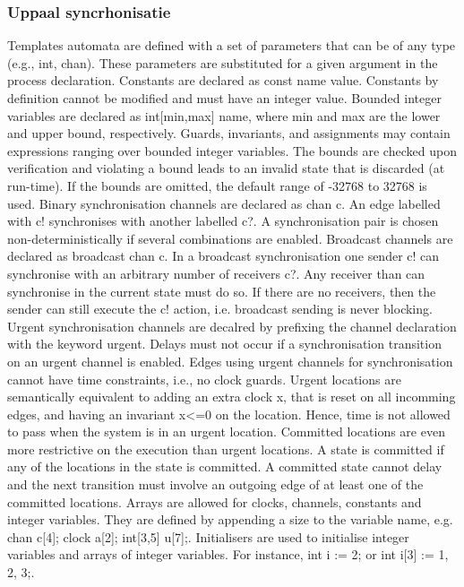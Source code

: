 \subsubsection{Uppaal syncrhonisatie}




Templates automata are defined with a set of parameters that can be of any
type (e.g., int, chan). These parameters are substituted for a given argument
in the process declaration.
Constants are declared as const name value. Constants by definition cannot
be modified and must have an integer value.
Bounded integer variables are declared as int[min,max] name, where min
and max are the lower and upper bound, respectively. Guards, invariants, and
assignments may contain expressions ranging over bounded integer variables.
The bounds are checked upon verification and violating a bound leads to an
invalid state that is discarded (at run-time). If the bounds are omitted, the
default range of -32768 to 32768 is used.
Binary synchronisation channels are declared as chan c. An edge labelled
with c! synchronises with another labelled c?. A synchronisation pair is
chosen non-deterministically if several combinations are enabled.
Broadcast channels are declared as broadcast chan c. In a broadcast synchronisation
one sender c! can synchronise with an arbitrary number of
receivers c?. Any receiver than can synchronise in the current state must do
so. If there are no receivers, then the sender can still execute the c! action,
i.e. broadcast sending is never blocking.
Urgent synchronisation channels are decalred by prefixing the channel declaration
with the keyword urgent. Delays must not occur if a synchronisation
transition on an urgent channel is enabled. Edges using urgent channels for
synchronisation cannot have time constraints, i.e., no clock guards.
Urgent locations are semantically equivalent to adding an extra clock x, that
is reset on all incomming edges, and having an invariant x<=0 on the location.
Hence, time is not allowed to pass when the system is in an urgent location.
Committed locations are even more restrictive on the execution than urgent
locations. A state is committed if any of the locations in the state is committed.
A committed state cannot delay and the next transition must involve
an outgoing edge of at least one of the committed locations.
Arrays are allowed for clocks, channels, constants and integer variables. They
are defined by appending a size to the variable name, e.g. chan c[4]; clock
a[2]; int[3,5] u[7];.
Initialisers are used to initialise integer variables and arrays of integer variables.
For instance, int i := 2; or int i[3] := {1, 2, 3};.
 


